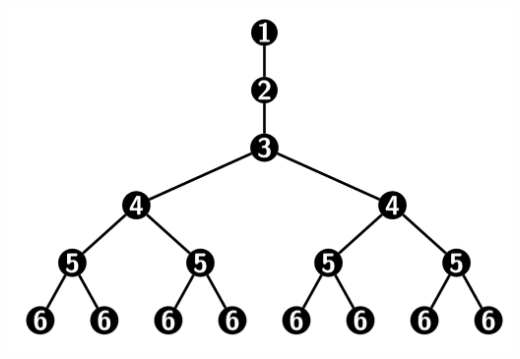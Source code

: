 \documentclass[10pt]{beamer}
\theoremstyle{plain}
\theoremstyle{definition}
\begin{document}
\begin{frame}
{\begin{center}
\begin{minipage}{0.2\linewidth}
				\end{minipage}
				\begin{minipage}{0.08\linewidth}
					\hspace{0.2cm}
				\end{minipage}
				\begin{minipage}{0.2\linewidth}
					\includegraphics[width=1.4\linewidth]{ramificacoes.png}
				\end{minipage}
			\end{center}
		}	
	\end{frame}
	
\end{document}
